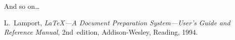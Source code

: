 \documentclass[a4paper]{article}
\begin{document}
And so on\ldots



\setcounter{secnumdepth}{0}

\begin{thebibliography}{9}
	\providecommand*{\bysame}{\leavevmode\hbox to3em{\hrulefill}\thinspace}

		L.~Lamport, \emph{\LaTeX---A Document Preparation
		System---User's Guide and Reference Manual}, 2nd~edition,
		Addison-Wesley, Reading, 1994.

\end{thebibliography}
\end{document}
